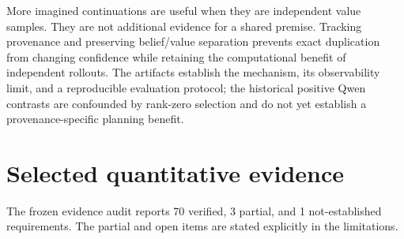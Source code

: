\documentclass[10pt]{article}
\begin{document}
More imagined continuations are useful when they are independent value samples. They are not additional evidence for a shared premise. Tracking provenance and preserving belief/value separation prevents exact duplication from changing confidence while retaining the computational benefit of independent rollouts. The artifacts establish the mechanism, its observability limit, and a reproducible evaluation protocol; the historical positive Qwen contrasts are confounded by rank-zero selection and do not yet establish a provenance-specific planning benefit.
\clearpage\section{Selected quantitative evidence}
The frozen evidence audit reports 70 verified, 3 partial, and 1 not-established requirements. The partial and open items are stated explicitly in the limitations.
\end{document}
